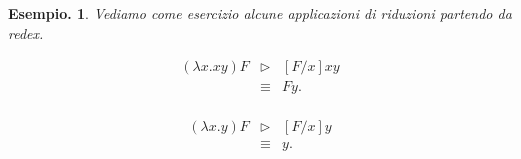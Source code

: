 \documentclass{book}
\newtheorem{esempio}{Esempio.}
\begin{document}
\begin{esempio}
Vediamo come esercizio alcune applicazioni di riduzioni partendo da redex.

\begin{equation}
\begin{array}{lcl}
(\lambda x.xy)F & \vartriangleright & [F/x]xy \\
                & \equiv & Fy. \\
\end{array}
\end{equation}

\begin{equation}
\begin{array}{lcl}
(\lambda x.y)F & \vartriangleright & [F/x]y \\
               & \equiv & y.  \\
\end{array}
\end{equation}


\end{esempio}
\end{document}
